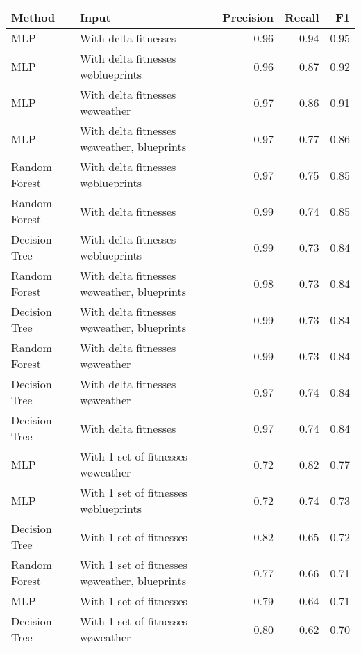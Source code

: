 \begin{tabular}{llrrr}
\toprule
        Method &                                           Input &  Precision &  Recall &   F1 \\
\midrule
           MLP &                            With delta fitnesses &       0.96 &    0.94 & 0.95 \\
           MLP &             With delta fitnesses w\o blueprints &       0.96 &    0.87 & 0.92 \\
           MLP &                With delta fitnesses w\o weather &       0.97 &    0.86 & 0.91 \\
           MLP &    With delta fitnesses w\o weather, blueprints &       0.97 &    0.77 & 0.86 \\
 Random Forest &             With delta fitnesses w\o blueprints &       0.97 &    0.75 & 0.85 \\
 Random Forest &                            With delta fitnesses &       0.99 &    0.74 & 0.85 \\
 Decision Tree &             With delta fitnesses w\o blueprints &       0.99 &    0.73 & 0.84 \\
 Random Forest &    With delta fitnesses w\o weather, blueprints &       0.98 &    0.73 & 0.84 \\
 Decision Tree &    With delta fitnesses w\o weather, blueprints &       0.99 &    0.73 & 0.84 \\
 Random Forest &                With delta fitnesses w\o weather &       0.99 &    0.73 & 0.84 \\
 Decision Tree &                With delta fitnesses w\o weather &       0.97 &    0.74 & 0.84 \\
 Decision Tree &                            With delta fitnesses &       0.97 &    0.74 & 0.84 \\
           MLP &             With 1 set of fitnesses w\o weather &       0.72 &    0.82 & 0.77 \\
           MLP &          With 1 set of fitnesses w\o blueprints &       0.72 &    0.74 & 0.73 \\
 Decision Tree &                         With 1 set of fitnesses &       0.82 &    0.65 & 0.72 \\
 Random Forest & With 1 set of fitnesses w\o weather, blueprints &       0.77 &    0.66 & 0.71 \\
           MLP &                         With 1 set of fitnesses &       0.79 &    0.64 & 0.71 \\
 Decision Tree &             With 1 set of fitnesses w\o weather &       0.80 &    0.62 & 0.70 \\

\end{tabular}
